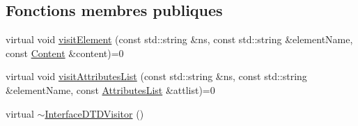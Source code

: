 \subsection*{Fonctions membres publiques}
\begin{DoxyCompactItemize}
\item 
virtual void \hyperlink{classdtd_1_1_interface_d_t_d_visitor_a46b882a06961ea04fd43b2a9d937118b}{visitElement} (const std::string \&ns, const std::string \&elementName, const \hyperlink{classdtd_1_1_content}{Content} \&content)=0
\item 
virtual void \hyperlink{classdtd_1_1_interface_d_t_d_visitor_a729d9fcb360d9bf45210aac109b388da}{visitAttributesList} (const std::string \&ns, const std::string \&elementName, const \hyperlink{namespacedtd_a8d5d29abb5de0468925f321597f57f4b}{AttributesList} \&attlist)=0
\item 
virtual \hyperlink{classdtd_1_1_interface_d_t_d_visitor_aef94cba5e56a7891a24b236176a2075a}{$\sim$InterfaceDTDVisitor} ()
\end{DoxyCompactItemize}
